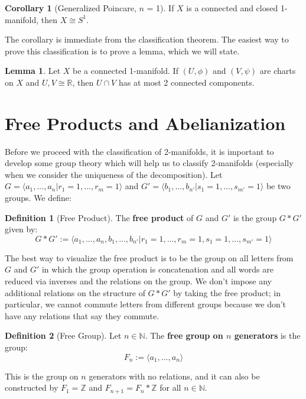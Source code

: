 \documentclass[11pt, oneside]{amsart}   	%
\theoremstyle{definition}
\newtheorem{definition}{Definition}[section]
\newtheorem{corollary}{Corollary}[theorem]
\newtheorem{lemma}[theorem]{Lemma}
\begin{document}
	\begin{corollary}[Generalized Poincare, $n$ = 1]
		If $X$ is a connected and closed 1-manifold, then $X\cong S^1$.
	\end{corollary}
	
	The corollary is immediate from the classification theorem. The easiest way to prove this classification is to prove a lemma, which we will state.
	
	\begin{lemma}
		Let $X$ be a connected 1-manifold. If $(U, \phi)$ and $(V, \psi)$ are charts on $X$ and $U, V\cong\mathbb R$, then $U\cap V$ has at most 2 connected 
		components.
	\end{lemma}
	
\section{Free Products and Abelianization}

	Before we proceed with the classification of 2-manifolds, it is important to develop some group theory which will help us to classify 2-manifolds (especially 
	when we consider the uniqueness of the decomposition). Let $G = \langle a_1, ..., a_n | r_1 = 1, ..., r_m = 1\rangle$ and $G' = \langle b_1, ..., b_{n'} | s_1 = 
	1, ..., s_{m'} = 1\rangle$ be two groups. We define:
	
	\begin{definition}[Free Product]
		The \textbf{free product} of $G$ and $G'$ is the group $G*G'$ given by:
		$$
			G*G' := \langle a_1, ..., a_n, b_1, ..., b_{n'} | r_1 = 1, ..., r_m = 1, s_1 = 1, ..., s_{m'} = 1\rangle
		$$
	\end{definition}
	
	The best way to visualize the free product is to be the group on all letters from $G$ and $G'$ in which the group operation is concatenation and all words 
	are reduced via inverses and the relations on the group. We don't impose any additional relations on the structure of $G*G'$ by taking the free product; 
	in particular, we cannot commute letters from different groups because we don't have any relations that say they commute. 
	
	\begin{definition}[Free Group]
		Let $n\in\mathbb N$. The \textbf{free group on $n$ generators} is the group:
		$$
			F_n := \langle a_1, ..., a_n\rangle
		$$
	\end{definition}
	
	This is the group on $n$ generators with no relations, and it can also be constructed by $F_1 = \mathbb Z$ and $F_{n + 1} = F_n * \mathbb Z$ for all $n\in 
	\mathbb N$. 
	
\end{document}
